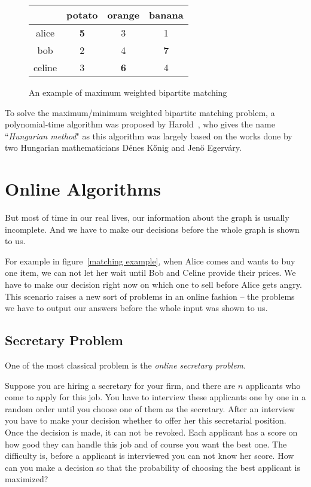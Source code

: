 \begin{figure}
\begin{center}
\begin{tabular}{| c | c | c | c |}
    \hline
        & potato & orange & banana \\
    \hline
        alice & {\bf \color{red} 5} & 3 & 1 \\
    \hline
        bob & 2 & 4 & {\bf \color{red} 7} \\
    \hline
        celine & 3 & {\bf \color{red} 6} & 4 \\
    \hline
\end{tabular}
\end{center}
\label{matchingexample}
\caption{An example of maximum weighted bipartite matching}
\end{figure}

To solve the maximum/minimum weighted bipartite matching problem, a 
polynomial-time algorithm was proposed by Harold~\cite{kuhn1955hungarian}, 
who gives the name ``\emph{Hungarian method}" as this algorithm was 
largely based on the works done by two Hungarian mathematicians 
D\'{e}nes K\H{o}nig and Jen\H{o} Egerv\'{a}ry.

\section{Online Algorithms}

But most of time in our real lives, our information about the graph is
usually incomplete. And we have to make our decisions before the whole
graph is shown to us.

For example in figure~\ref{matching example}, when Alice comes and wants
to buy one item, we can not let her wait until Bob and Celine provide their
prices. We have to make our decision right now on which one to sell before
Alice gets angry. This scenario raises a new sort of problems in an online
fashion -- the problems we have to output our answers before 
the whole input was shown to us.

\subsection{Secretary Problem}

One of the most classical problem is the \emph{online secretary problem}.

Suppose you are hiring a secretary for your firm, and there are $n$
applicants who come to apply for this job. You have to interview these
applicants one by one in a random order until you choose one of 
them as the secretary. After an interview you have to make your decision
whether to offer her this secretarial position.
Once the decision is made, it can not be revoked.
Each applicant has a score on how good they can handle this job and
of course you want the best one. The difficulty is, before a applicant is
interviewed you can not know her score.
How can you make a decision so that the probability of choosing the best
applicant is maximized?

